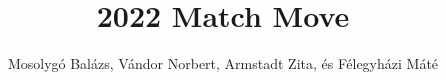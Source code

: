 \documentclass[runningheads]{llncs}
\begin{document}
\title{2022 Match Move}


\author{Mosolygó Balázs, Vándor Norbert, Armstadt Zita, és Félegyházi Máté}






\maketitle






\end{document}
